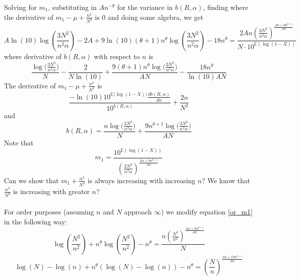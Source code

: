 \documentclass{article}
\newcommand{\aadit}[1]{\begingroup\color{orange}#1\endgroup}
\begin{document}
Solving for $m_1$, substituting in $An^{-\theta}$ for the variance in $b(R,\alpha)$, finding where the derivative of $m_1 - \mu + \frac{n^2}{N^2}$ is $0$ and doing some algebra, we get
\begin{equation} \label{or_m1}
A \ln(10) \log\left( \frac{3 N^2}{n^2 \alpha} \right) - 2A + 9\ln(10)(\theta + 1)n^{\theta} \log\left( \frac{3 N^2}{n^2 \alpha} \right) - 18n^\theta = \frac{2 An \left( \frac{3 N^2}{n^2 \alpha} \right)^{\frac{A n + 9 n^{\theta + 1}}{A n}}}{N \cdot 10^{\mathbb{E}( \log(1 - X))}}
\end{equation}
where derivative of $b(R,\alpha)$ with respect to $n$ is 
\begin{equation}
    \frac{\log\Big(\frac{3N^2}{n^2\alpha}\Big)}{N} - \frac{2}{N\ln(10)} + \frac{9(\theta + 1)n^\theta\log\Big(\frac{3N^2}{n^2\alpha}\Big)}{AN} - \frac{18n^\theta}{\ln(10)AN}
\end{equation}
The derivative of $m_1 - \mu + \frac{n^2}{N^2}$ is 
\begin{equation}
    \frac{-\ln(10)10^{\mathbb{E}\Big(\log(1 - X)\Big)}\frac{db(R,\alpha)}{dn}}{10^{b(R,\alpha)}} + \frac{2n}{N^2}
\end{equation}
and 
\begin{equation}
    b(R,\alpha) = \frac{n\log\Big(\frac{3N^2}{n^2\alpha}\Big)}{N} + \frac{9n^{\theta + 1}\log\Big(\frac{3N^2}{n^2\alpha}\Big)}{AN}
\end{equation}
Note that
\begin{equation}
m_1 = \frac{10^{\mathbb{E} \left( \log(1 - X) \right)}}{\left( \frac{3 N^2}{n^2 \alpha} \right)^{\frac{A n + 9 n^{\theta + 1}}{A n}}}
\end{equation}
 \aadit{Can we show that $m_1 + \frac{n^2}{N^2}$ is always increasing with increasing $n$? We know that$\frac{n^2}{N^2}$ is increasing with greater $n$?} \\\\
\noindent For order purposes (assuming $n$ and $N$ approach $\infty$)  we modify equation \eqref{or_m1} in the following way:
\begin{equation}
\log\left( \frac{N^2}{n^2} \right) +n^{\theta} \log\left( \frac{N^2}{n^2} \right) -n^{\theta} =\frac{n \left( \frac{N^2}{n^2} \right)^{\frac{A n + 9 n^{\theta + 1}}{A n}}}{N}
\end{equation}
\begin{equation}
\log(N) - \log(n) + n^\theta (\log(N) - \log(n)) - n^\theta = \left( \frac{N}{n} \right)^{\frac{A n + 18 n^{\theta + 1}}{A n}}
\end{equation}
\end{document}
